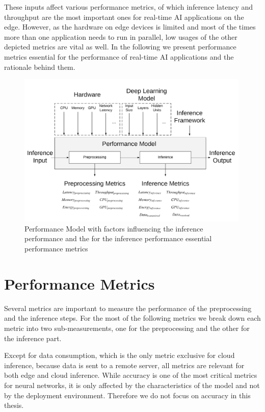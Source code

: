 These inputs affect various performance metrics, of which inference latency and throughput are the most important ones for real-time AI applications on the edge. However, as the hardware on edge devices is limited and most of the times more than one application needs to run in parallel, low usages of the other depicted metrics are vital as well.
In the following we present performance metrics essential for the performance of real-time AI applications and the rationale behind them.
\begin{figure}[!htb]
\centering
\includegraphics[width=0.99\textwidth]{./Bilder/PerformanceModel.png}
\caption{Performance Model with factors influencing the inference performance and the for the inference performance essential performance metrics}
\label{fig:perfmodel}
\end{figure}






\section{Performance Metrics}
\label{chap:metrics}
Several metrics are important to measure the performance of the preprocessing and the inference steps. For the most of the following metrics we break down each metric into two sub-measurements, one for the preprocessing  and the other for the inference part.

Except for data consumption, which is the only metric exclusive for cloud inference, because data is sent to a remote server, all metrics are relevant for both edge and cloud inference.
While accuracy is one of the most critical metrics for neural networks, it is only affected by the characteristics of the model and not by the deployment environment. Therefore we do not focus on accuracy in this thesis.

